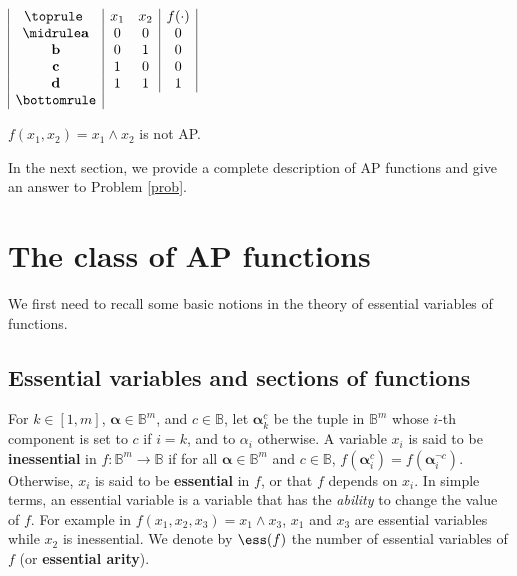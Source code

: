 \documentclass[article]{amsart}
\begin{document}
\begin{table}[ht]
$\begin{array}{|c|cc|c|}
  \toprule
  ~ & x_1 & x_2 & f(\cdot) \\
  \midrule
  \mathbf{a} & 0 & 0 & 0\\
  \mathbf{b} & 0 & 1 & 0\\
  \mathbf{c} & 1 & 0 & 0\\
  \mathbf{d} & 1 & 1 & 1\\
  \bottomrule
\end{array}
$\bigskip
\caption{$f(x_1,x_2)= x_1 \wedge x_2$ is not AP.}
\label{exampleNotAP}
\end{table}

In the next section, we provide a complete description of AP functions and give
an answer to Problem \ref{prob}.

\section{The class of AP functions}
\label{class_of_ap_functions}

We first need to recall some basic notions in the theory of essential variables
of functions.

\subsection{Essential variables and sections of functions}

For $k\in [1,m]$, $\boldsymbol{\alpha}\in \mathbb{B}^m$, and $c \in
\mathbb{B}$, let ${\boldsymbol{\alpha}}_{k}^c$ be the tuple in $\mathbb{B}^{m}$
whose $i$-th component is set to $c$ if $i=k$, and to $\alpha_i$ otherwise.  A
variable $x_i$ is said to be \textbf{inessential} in $f\colon \mathbb{B}^m\to
\mathbb{B}$ if for all $\boldsymbol{\alpha} \in \mathbb{B}^m$ and $c \in
\mathbb{B}$, $f(\boldsymbol{\alpha}^c_i) = f(\boldsymbol{\alpha}^{\neg c}_i)$.
Otherwise, $x_i$ is said to be \textbf{essential} in $f$, or that $f$ depends
on $x_i$. In simple terms, an
essential variable is a variable that has the \textit{ability} to change the
value of $f$. For example in $f(x_1, x_2, x_3) = x_1 \wedge x_3$, $x_1$ and
$x_3$ are essential variables while $x_2$ is inessential.  We denote by
$\ess(f)$ the number of essential variables of $f$ (or \textbf{essential
arity}).
\end{document}

